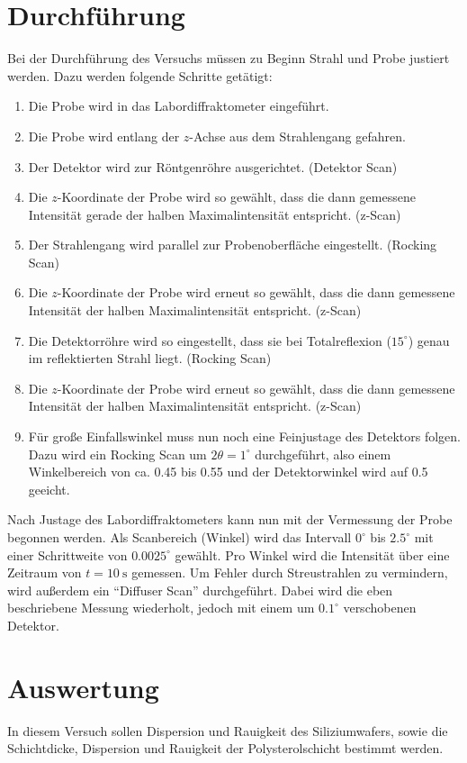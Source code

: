 \section{Durchführung}
Bei der Durchführung des Versuchs müssen zu Beginn Strahl und Probe justiert werden. Dazu werden folgende Schritte getätigt:
\begin{enumerate}
 \item Die Probe wird in das Labordiffraktometer eingeführt.
 \item Die Probe wird entlang der $z$-Achse aus dem Strahlengang gefahren.
 \item Der Detektor wird zur Röntgenröhre ausgerichtet. (Detektor Scan)
 \item Die $z$-Koordinate der Probe wird so gewählt, dass die dann gemessene Intensität gerade der halben Maximalintensität entspricht. (z-Scan)
 \item Der Strahlengang wird parallel zur Probenoberfläche eingestellt. (Rocking Scan)
 \item Die $z$-Koordinate der Probe wird erneut so gewählt, dass die dann gemessene Intensität der halben Maximalintensität entspricht. (z-Scan)
 \item Die Detektorröhre wird so eingestellt, dass sie bei Totalreflexion ($15^\circ$) genau im reflektierten Strahl liegt. (Rocking Scan)
 \item Die $z$-Koordinate der Probe wird erneut so gewählt, dass die dann gemessene Intensität der halben Maximalintensität entspricht. (z-Scan)
 \item Für große Einfallswinkel muss nun noch eine Feinjustage des Detektors folgen. Dazu wird ein Rocking Scan um $2\theta=1^\circ$ durchgeführt, also einem
 Winkelbereich von ca. 0.45 bis 0.55 und der Detektorwinkel wird auf 0.5 geeicht.
\end{enumerate}
Nach Justage des Labordiffraktometers kann nun mit der Vermessung der Probe begonnen werden. Als Scanbereich (Winkel) wird das Intervall $0^\circ$ bis 
$2.5^\circ$ mit einer Schrittweite von $0.0025^\circ$ gewählt. Pro Winkel wird die Intensität über eine Zeitraum von $t=\SI{10}{\second}$ gemessen. Um Fehler durch
Streustrahlen zu vermindern, wird außerdem ein ``Diffuser Scan'' durchgeführt. Dabei wird die eben beschriebene Messung wiederholt, jedoch mit einem um
$0.1^\circ$ verschobenen Detektor.

\section{Auswertung}
In diesem Versuch sollen Dispersion und Rauigkeit des Siliziumwafers, sowie die Schichtdicke, Dispersion und Rauigkeit der Polysterolschicht bestimmt werden.

